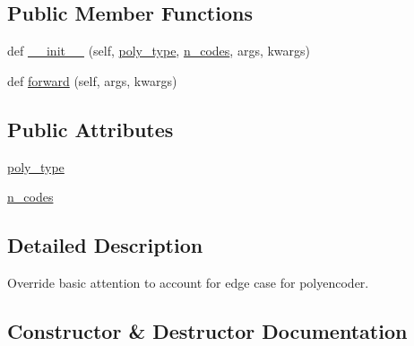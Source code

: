 \subsection*{Public Member Functions}
\begin{DoxyCompactItemize}
\item 
def \hyperlink{classparlai_1_1agents_1_1transformer_1_1polyencoder_1_1PolyBasicAttention_a421bbb5dad363d0d16be9ab49b13a4e3}{\+\_\+\+\_\+init\+\_\+\+\_\+} (self, \hyperlink{classparlai_1_1agents_1_1transformer_1_1polyencoder_1_1PolyBasicAttention_aa82d4585cb9a4f671353565fcc0785ab}{poly\+\_\+type}, \hyperlink{classparlai_1_1agents_1_1transformer_1_1polyencoder_1_1PolyBasicAttention_a45603a52525744549d48b10e0bd1b63c}{n\+\_\+codes}, args, kwargs)
\item 
def \hyperlink{classparlai_1_1agents_1_1transformer_1_1polyencoder_1_1PolyBasicAttention_a6927374c5336d0111ab936c1fd2b62ff}{forward} (self, args, kwargs)
\end{DoxyCompactItemize}
\subsection*{Public Attributes}
\begin{DoxyCompactItemize}
\item 
\hyperlink{classparlai_1_1agents_1_1transformer_1_1polyencoder_1_1PolyBasicAttention_aa82d4585cb9a4f671353565fcc0785ab}{poly\+\_\+type}
\item 
\hyperlink{classparlai_1_1agents_1_1transformer_1_1polyencoder_1_1PolyBasicAttention_a45603a52525744549d48b10e0bd1b63c}{n\+\_\+codes}
\end{DoxyCompactItemize}


\subsection{Detailed Description}
\begin{DoxyVerb}Override basic attention to account for edge case for polyencoder.
\end{DoxyVerb}
 

\subsection{Constructor \& Destructor Documentation}
\mbox{\label{classparlai_1_1agents_1_1transformer_1_1polyencoder_1_1PolyBasicAttention_a421bbb5dad363d0d16be9ab49b13a4e3}} 
